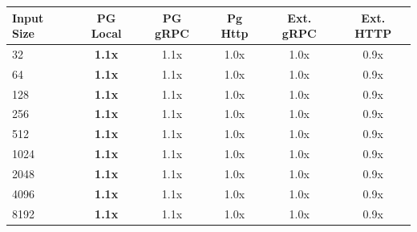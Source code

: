 \begin{tabular}{lccccc}
\toprule
\textbf{Input Size} & \textbf{PG Local} & \textbf{PG gRPC} & \textbf{Pg Http} & \textbf{Ext. gRPC} & \textbf{Ext. HTTP} \\
\midrule
32 & \textbf{1.1x} & 1.1x & 1.0x & 1.0x & 0.9x \\
64 & \textbf{1.1x} & 1.1x & 1.0x & 1.0x & 0.9x \\
128 & \textbf{1.1x} & 1.1x & 1.0x & 1.0x & 0.9x \\
256 & \textbf{1.1x} & 1.1x & 1.0x & 1.0x & 0.9x \\
512 & \textbf{1.1x} & 1.1x & 1.0x & 1.0x & 0.9x \\
1024 & \textbf{1.1x} & 1.1x & 1.0x & 1.0x & 0.9x \\
2048 & \textbf{1.1x} & 1.1x & 1.0x & 1.0x & 0.9x \\
4096 & \textbf{1.1x} & 1.1x & 1.0x & 1.0x & 0.9x \\
8192 & \textbf{1.1x} & 1.1x & 1.0x & 1.0x & 0.9x \\
\bottomrule
\end{tabular}
